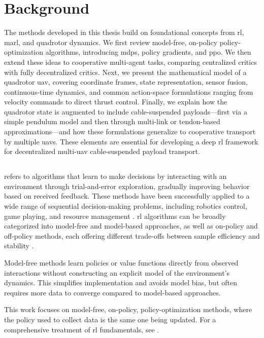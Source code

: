\chapter{Background}
The methods developed in this thesis build on foundational concepts from \gls{rl}, \gls{marl}, and quadrotor dynamics. We first review model-free, on-policy policy-optimization algorithms, introducing \gls{mdp}s, policy gradients, and \gls{ppo}. We then extend these ideas to cooperative multi-agent tasks, comparing centralized critics with fully decentralized critics. Next, we present the mathematical model of a quadrotor \gls{uav}, covering coordinate frames, state representation, sensor fusion, continuous-time dynamics, and common action-space formulations ranging from velocity commands to direct thrust control. Finally, we explain how the quadrotor state is augmented to include cable-suspended payloads—first via a simple pendulum model and then through multi-link or tendon-based approximations—and how these formulations generalize to cooperative transport by multiple \glspl{uav}. These elements are essential for developing a deep \gls{rl} framework for decentralized multi-\gls{uav} cable-suspended payload transport.

\section{}
 refers to algorithms that learn to make decisions by interacting with an environment through trial-and-error exploration, gradually improving behavior based on received feedback. These methods have been successfully applied to a wide range of sequential decision-making problems, including robotics control, game playing, and resource management \cite{mnih2015human}. \gls{rl} algorithms can be broadly categorized into model-free and model-based approaches, as well as on-policy and off-policy methods, each offering different trade-offs between sample efficiency and stability \cite{Schulman2015TrustRP}.  

Model-free methods learn policies or value functions directly from observed interactions without constructing an explicit model of the environment's dynamics. This simplifies implementation and avoids model bias, but often requires more data to converge compared to model-based approaches.  

This work focuses on model-free, on-policy, policy-optimization methods, where the policy used to collect data is the same one being updated. For a comprehensive treatment of \gls{rl} fundamentals, see \cite{SuttonBarto2018}.
